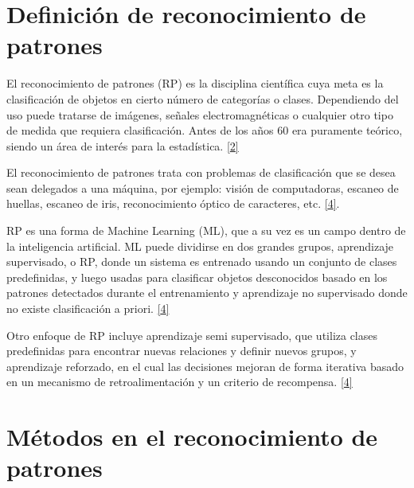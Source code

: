 \documentclass[12pt,spanish,Letterpaper,openany]{book}
\newcommand{\spaceminusmilis}{\vspace{-0.5mm}}
\begin{document}
\hypertarget{definiciuxf3n-de-reconocimiento-de-patrones}{%
\section{Definición de reconocimiento de patrones}\label{definiciuxf3n-de-reconocimiento-de-patrones}}

El reconocimiento de patrones (RP) es la disciplina científica cuya meta es la clasificación de objetos en cierto número de categorías o clases. Dependiendo del uso puede tratarse de imágenes, señales electromagnéticas o cualquier otro tipo de medida que requiera clasificación. Antes de los años 60 era puramente teórico, siendo un área de interés para la estadística. \protect\hyperlink{articulo12_ref02}{{[}2{]}}
\hypertarget{articulo12_cross03}{}

\spaceminusmilis

El reconocimiento de patrones trata con problemas de clasificación que se desea sean delegados a una máquina, por ejemplo: visión de computadoras, escaneo de huellas, escaneo de iris, reconocimiento óptico de caracteres, etc. \protect\hyperlink{articulo12_ref04}{{[}4{]}}.

\spaceminusmilis

RP es una forma de Machine Learning (ML), que a su vez es un campo dentro de la inteligencia artificial. ML puede dividirse en dos grandes grupos, aprendizaje supervisado, o RP, donde un sistema es entrenado usando un conjunto de clases predefinidas, y luego usadas para clasificar objetos desconocidos basado en los patrones detectados durante el entrenamiento y aprendizaje no supervisado donde no existe clasificación a priori. \protect\hyperlink{articulo12_ref04}{{[}4{]}}
\hypertarget{articulo12_cross04}{}

\spaceminusmilis

Otro enfoque de RP incluye aprendizaje semi supervisado, que utiliza clases predefinidas para encontrar nuevas relaciones y definir nuevos grupos, y aprendizaje reforzado, en el cual las decisiones mejoran de forma iterativa basado en un mecanismo de retroalimentación y un criterio de recompensa. \protect\hyperlink{articulo12_ref04}{{[}4{]}}

\hypertarget{muxe9todos-en-el-reconocimiento-de-patrones}{%
\section{Métodos en el reconocimiento de patrones}\label{muxe9todos-en-el-reconocimiento-de-patrones}}
\end{document}
